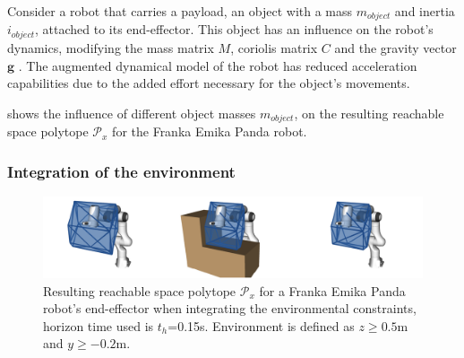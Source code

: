 Consider a robot that carries a payload, an object with a mass $m_{object}$ and inertia $i_{object}$, attached to its end-effector. This object has an influence on the robot's dynamics, modifying the mass matrix $M$, coriolis matrix $C$ and the gravity vector $\bm{g}$ \cite{hamad2019}.
The augmented dynamical model of the robot has reduced acceleration capabilities due to the added effort necessary for the object's movements.


 shows the influence of different object masses $m_{object}$, on the resulting reachable space polytope $\mathcal{P}_x$ for the {Franka Emika Panda} robot. 

\subsubsection{Integration of the environment}

\begin{figure}[!b]
    \centering
    \includegraphics[width=\linewidth]{Papers/images/env1.png}
    \caption{Resulting reachable space polytope $\mathcal{P}_x$ for a Franka Emika Panda robot's end-effector when integrating the environmental constraints, horizon time used is $t_h$=0.15s. Environment is defined as $z\geq0.5$m and $y\geq-0.2$m.}
    \label{fig:env}
    
\end{figure}

